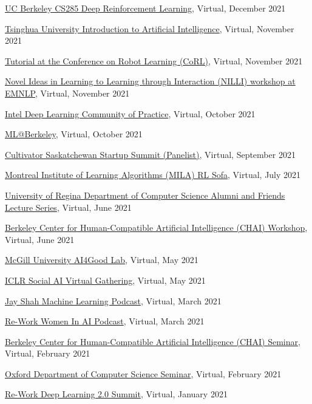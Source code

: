 \documentclass[paper=letter,fontsize=11pt]{scrartcl} %
\newcommand{\TalkEntry}[4]{
		\noindent \href{#4}{#1}, #2, #3 }
\begin{document}
\begin{etaremune}
\item\TalkEntry{UC Berkeley CS285 Deep Reinforcement Learning}{Virtual}{December 2021}{}
\item\TalkEntry{Tsinghua University Introduction to Artificial Intelligence}{Virtual}{November 2021}{}
\item\TalkEntry{Tutorial at the Conference on Robot Learning (CoRL)}{Virtual}{November 2021}{https://youtu.be/5KjpZS4_RBs?t=27626}
\item\TalkEntry{Novel Ideas in Learning to Learning through Interaction (NILLI) workshop at EMNLP}{Virtual}{November 2021}{https://www.cs.mcgill.ca/~pparth2/nilli_workshop/}
\item\TalkEntry{Intel Deep Learning Community of Practice}{Virtual}{October 2021}{https://youtu.be/TggAeE1wjVI}
\item\TalkEntry{ML@Berkeley}{Virtual}{October 2021}{}
\item\TalkEntry{Cultivator Saskatchewan Startup Summit (Panelist)}{Virtual}{September 2021}{}
\item\TalkEntry{Montreal Institute of Learning Algorithms (MILA) RL Sofa}{Virtual}{July 2021}{https://bluejeans.com/s/mw4d0UxFM_J/}
\item\TalkEntry{University of Regina Department of Computer Science Alumni and Friends Lecture Series}{Virtual}{June 2021}{https://www.uregina.ca/science/cs/events/2021/06/social-reinforcement-learning-vl.html}
\item\TalkEntry{Berkeley Center for Human-Compatible Artificial Intelligence (CHAI) Workshop}{Virtual}{June 2021}{}
\item\TalkEntry{McGill University AI4Good Lab}{Virtual}{May 2021}{https://www.ai4goodlab.com/montreal-program}
\item\TalkEntry{ICLR Social AI Virtual Gathering}{Virtual}{May 2021}{https://iclr.cc/virtual/2021/social/4423}
\item\TalkEntry{Jay Shah Machine Learning Podcast}{Virtual}{March 2021}{https://www.youtube.com/watch?v=8XpCnmvq49s}
\item\TalkEntry{Re-Work Women In AI Podcast}{Virtual}{March 2021}{https://www.youtube.com/watch?v=_gLU5Uw4TWU}
\item\TalkEntry{Berkeley Center for Human-Compatible Artificial Intelligence (CHAI) Seminar}{Virtual}{February 2021}{}
\item\TalkEntry{Oxford Department of Computer Science Seminar}{Virtual}{February 2021}{http://www.cs.ox.ac.uk/seminars/2371.html}
\item\TalkEntry{Re-Work Deep Learning 2.0 Summit}{Virtual}{January 2021}{https://www.re-work.co/events/reinforcement-learning-summit}%

\end{etaremune}
\end{document}
